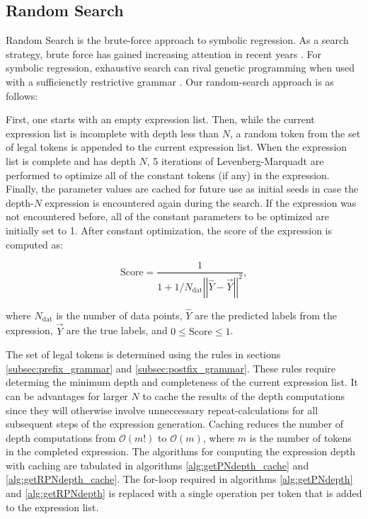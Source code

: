 \documentclass[12pt]{iopart}
\begin{document}
\subsection{Random Search}\label{subsec:RandomSearch}

Random Search is the brute-force approach to symbolic regression.  As a search strategy, brute force has gained increasing attention in recent years \cite{Heule2017TheSO}. For symbolic regression, exhaustive search can rival genetic programming when used with a sufficienctly restrictive grammar \cite{Kammerer2020}.
Our random-search approach is as follows:
\par First, one starts with an empty expression list. Then, while the current expression list is incomplete with depth less than $N$, a random token from the set of legal tokens is appended to the current expression list. When the expression list is complete and has depth $N$, 5 iterations of Levenberg-Marquadt are performed to optimize all of the constant tokens (if any) in the expression. Finally, the parameter values are cached for future use as initial seeds in case the depth-$N$ expression is encountered again during the search. If the expression was not encountered before, all of the constant parameters to be optimized are initially set to 1. After constant optimization, the score of the expression is computed as:

\begin{equation}
\mathrm{Score} = \frac{1}{1+ 1/N_{\mathrm{dat}}\left|\left|\hat{Y}-\vec{Y}\right|\right|^2}, \label{eq:score_formula}
\end{equation}

where $N_{\mathrm{dat}}$ is the number of data points, $\hat{Y}$ are the predicted labels from the expression, $\vec{Y}$ are the true labels, and $0 \leq \mathrm{Score} \leq 1$. 

\par The set of legal tokens is determined using the rules in sections \ref{subsec:prefix_grammar} and \ref{subsec:postfix_grammar}. These rules require determing the minimum depth and completeness of the current expression list. It can be advantages for larger $N$ to cache the results of the depth computations since they will otherwise involve unneccessary repeat-calculations for all subsequent steps of the expression generation. Caching reduces the number of depth computations from $\mathcal{O}(m!)$ to $\mathcal{O}(m)$, where $m$ is the number of tokens in the completed expression. The algorithms for computing the expression depth with caching are tabulated in algorithms \ref{alg:getPNdepth_cache} and \ref{alg:getRPNdepth_cache}. The for-loop required in algorithms \ref{alg:getPNdepth} and \ref{alg:getRPNdepth} is replaced with a single operation per token that is added to the expression list. 
\end{document}
